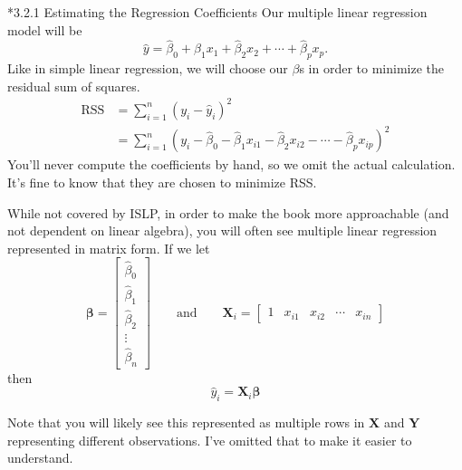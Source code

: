         *{3.2.1 Estimating the Regression Coefficients}\label{estimating-the-regression-coefficients}
        Our multiple linear regression model will be
        \begin{equation*}\tag{3.21}
            \hat y = \hat \beta_0 + \hat \beta_1 x_1 + \hat \beta_2 x_2 + \cdots + \hat \beta_p x_p.
        \end{equation*}
        Like in simple linear regression, we will choose our $\beta$s in order to minimize the residual sum of squares.
        \begin{align*}
            \text{RSS} &= \sum_{i=1}^n (y_i - \hat y_i)^2\\
                                &= \sum_{i=1}^n (y_i - \hat \beta_0 - \hat \beta_1 x_{i1} - \hat \beta_2 x_{i2} - \cdots - \hat \beta_p x_{ip})^2
        \end{align*}
        You'll never compute the coefficients by hand, so we omit the actual calculation.  It's fine to know that they are chosen to minimize RSS.
        \begin{note}
            While not covered by ISLP, in order to make the book more approachable (and not dependent on linear algebra), you will often see multiple linear regression represented in matrix form.
            If we let
            \begin{equation*}
                \boldsymbol{\beta} = \begin{bmatrix*}
                    \hat \beta_0\\
                    \hat \beta_1 \\
                    \hat \beta_2 \\
                    \vdots \\
                    \hat \beta_n
                \end{bmatrix*} \qquad \text{and} \qquad 
                \mathbf{X}_i= \begin{bmatrix*}
                    1 & x_{i1} & x_{i2} & \cdots & x_{in}
                \end{bmatrix*}
            \end{equation*}
            then
            \begin{equation*}
                \hat y_i = \mathbf{X}_i\boldsymbol{\beta}
             \end{equation*}
             
             Note that you will likely see this represented as multiple rows in $\mathbf{X}$ and $\mathbf{Y}$ representing different observations.  I've omitted that to make it easier to understand.
        \end{note}
        
